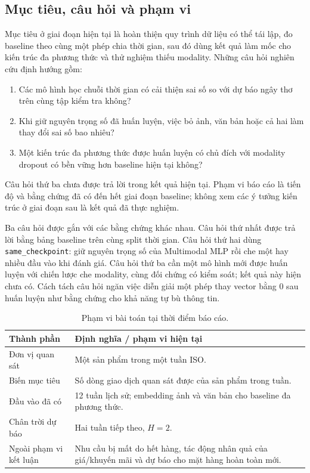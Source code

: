\documentclass[12pt,a4paper,oneside]{article}
\begin{document}
\subsection{Mục tiêu, câu hỏi và phạm vi}
Mục tiêu ở giai đoạn hiện tại là hoàn thiện quy trình dữ liệu có thể tái lập, đo baseline theo cùng một phép chia thời gian, sau đó dùng kết quả làm mốc cho kiến trúc đa phương thức và thử nghiệm thiếu modality. Những câu hỏi nghiên cứu định hướng gồm:
\begin{enumerate}
  \item Các mô hình học chuỗi thời gian có cải thiện sai số so với dự báo ngây thơ trên cùng tập kiểm tra không?
  \item Khi giữ nguyên trọng số đã huấn luyện, việc bỏ ảnh, văn bản hoặc cả hai làm thay đổi sai số bao nhiêu?
  \item Một kiến trúc đa phương thức được huấn luyện có chủ đích với modality dropout có bền vững hơn baseline hiện tại không?
\end{enumerate}
Câu hỏi thứ ba chưa được trả lời trong kết quả hiện tại. Phạm vi báo cáo là tiến độ và bằng chứng đã có đến hết giai đoạn baseline; không xem các ý tưởng kiến trúc ở giai đoạn sau là kết quả đã thực nghiệm.

Ba câu hỏi được gắn với các bằng chứng khác nhau. Câu hỏi thứ nhất được trả lời bằng bảng baseline trên cùng split thời gian. Câu hỏi thứ hai dùng \texttt{same\_checkpoint}: giữ nguyên trọng số của Multimodal MLP rồi che một hay nhiều đầu vào khi đánh giá. Câu hỏi thứ ba cần một mô hình mới được huấn luyện với chiến lược che modality, cùng đối chứng có kiểm soát; kết quả này hiện chưa có. Cách tách câu hỏi ngăn việc diễn giải một phép thay vector bằng 0 sau huấn luyện như bằng chứng cho khả năng tự bù thông tin.

\begin{table}[!htbp]
\centering
\caption{Phạm vi bài toán tại thời điểm báo cáo.}
\label{tab:scope}
\begin{tabular}{p{}p{}}
\toprule
Thành phần & Định nghĩa / phạm vi hiện tại \\
\midrule
Đơn vị quan sát & Một sản phẩm trong một tuần ISO. \\
Biến mục tiêu & Số dòng giao dịch quan sát được của sản phẩm trong tuần. \\
Đầu vào đã có & 12 tuần lịch sử; embedding ảnh và văn bản cho baseline đa phương thức. \\
Chân trời dự báo & Hai tuần tiếp theo, $H=2$. \\
Ngoài phạm vi kết luận & Nhu cầu bị mất do hết hàng, tác động nhân quả của giá/khuyến mãi và dự báo cho mặt hàng hoàn toàn mới. \\
\bottomrule
\end{tabular}
\end{table}
\end{document}
